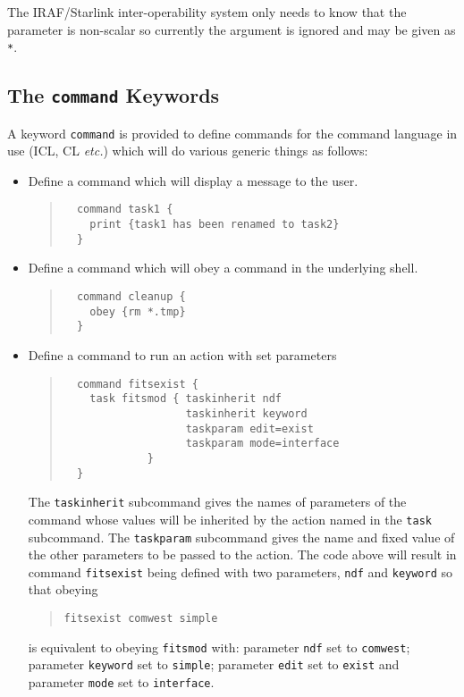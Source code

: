 \documentclass[twoside,11pt]{article}
\newcommand{\htmlref}[2]{#1}
\newcommand{\xlabel}[1]{}
\begin{document}
The IRAF/Starlink inter-operability system only needs to know that the
parameter is non-scalar so currently the argument is ignored and may be given
as \texttt{*}.

\subsection{\xlabel{the_command_keywords}The \texttt{command} Keywords}
A keyword
\htmlref{\texttt{command}}{command}
is provided to define commands for the command language in use (ICL, CL
\textit{etc.}) which will do various generic things as follows:
\begin{itemize}
\item Define a command which will display a message to the user.
\begin{quote} \begin{verbatim}
  command task1 {
    print {task1 has been renamed to task2}
  }
\end{verbatim} \end{quote}

\item Define a command which will obey a command in the underlying shell.
\begin{quote} \begin{verbatim}
  command cleanup {
    obey {rm *.tmp}
  }
\end{verbatim} \end{quote}

\item Define a command to run an action with set parameters
\begin{quote} \begin{verbatim}
  command fitsexist {
    task fitsmod { taskinherit ndf
                   taskinherit keyword
                   taskparam edit=exist
                   taskparam mode=interface
             }
  }
\end{verbatim} \end{quote}
The \texttt{taskinherit} subcommand gives the names of parameters of the
command whose values will be inherited by the action named in the
\texttt{task} subcommand.
The \texttt{taskparam} subcommand gives the name and fixed value of the other
parameters to be passed to the action.
The code above will result in command \texttt{fitsexist} being defined with
two parameters, \texttt{ndf} and \texttt{keyword} so that obeying
\begin{quote} \begin{verbatim}
fitsexist comwest simple
\end{verbatim} \end{quote}
is equivalent to obeying \texttt{fitsmod} with:
parameter \texttt{ndf} set to \texttt{comwest};
parameter \texttt{keyword} set to \texttt{simple};
parameter \texttt{edit} set to \texttt{exist}
and
parameter \texttt{mode} set to \texttt{interface}.


\end{itemize}
\end{document}
